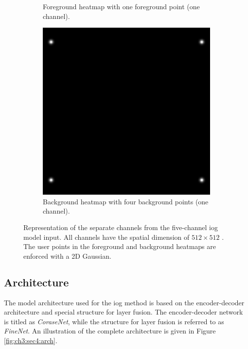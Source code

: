 \begin{figure}
\begin{subfigure}[b]{0.3\textwidth}
		\caption{Foreground heatmap with one foreground point (one channel).}
		\label{fig:ch3:sec4:fg_channel}
	\end{subfigure}
	\hfill
	\begin{subfigure}[b]{0.3\textwidth}
		\centering
		\includegraphics[width=\textwidth]{figures/chap34_channel_bg.png}
		\caption{Background heatmap with four background points (one channel).}
		\label{fig:ch3:sec4:bg_channel}
	\end{subfigure}
	\caption[Five-channel IOG model input]{
		Representation of the separate channels from the five-channel \gls{iog} model input.
		All channels have the spatial dimension of $512 \times 512$ .
		The user points in the foreground and background heatmaps are enforced with a 2D Gaussian.
	} \label{fig:ch3:sec4:model_input_channels}
\end{figure}

\subsection{Architecture}\label{ord:ch3:sec4:subsec3}

The model architecture used for the \gls{iog} method is based on the encoder-decoder architecture and special structure for layer fusion.
The encoder-decoder network is titled as \textit{CoraseNet}, while the structure for layer fusion is referred to as \textit{FineNet}.
An illustration of the complete architecture is given in Figure \ref{fig:ch3:sec4:arch}.


